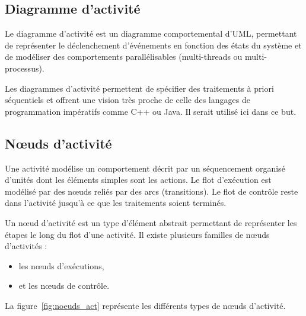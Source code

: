 \documentclass[11pt,a4paper]{paper}
\begin{document}
\newpage
\begin{appendices}

\section{Diagramme d'activité} 
\label{ann:diag_act}

\vspace{2mm}

Le diagramme d'activité est un diagramme comportemental d'UML, permettant de représenter le déclenchement d'événements en fonction des états du système et de modéliser des comportements parallélisables (multi-threads ou multi-processus).

Les diagrammes d'activité permettent de spécifier des traitements à priori séquentiels et offrent une vision très proche de celle des langages de programmation impératifs comme C++ ou Java. Il serait utilisé ici dans ce but.

\subsection{N{\oe}uds d'activité}

Une activité modélise un comportement décrit par un séquencement organisé d'unités dont les éléments simples sont les actions. Le flot d'exécution est modélisé par des n{\oe}uds reliés par des arcs (transitions). Le flot de contrôle reste dans l'activité jusqu'à ce que les traitements soient terminés.

Un n{\oe}ud d'activité est un type d'élément abstrait permettant de représenter les étapes le long du flot d'une activité. Il existe plusieurs familles de n{\oe}uds d'activités :
\begin{itemize}
\item les n{\oe}uds d'exécutions,
\item et les n{\oe}uds de contrôle.
\end{itemize}
La figure~\ref{fig:noeuds_act} représente les différents types de n{\oe}uds d'activité.


\end{appendices}
\end{document}
